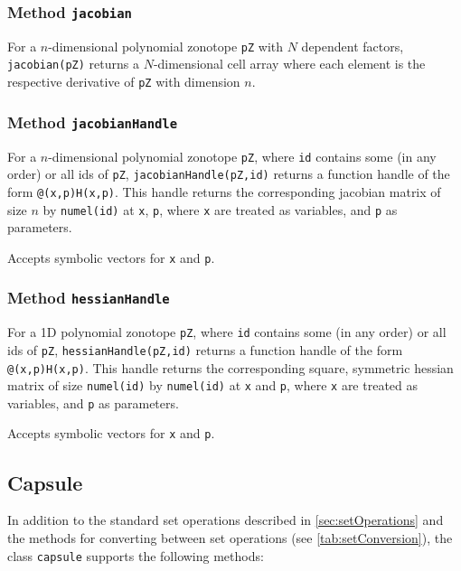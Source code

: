 \subsubsection{Method \texttt{jacobian}}
For a $n$-dimensional polynomial zonotope \texttt{pZ} with $N$ dependent factors, \texttt{jacobian(pZ)} returns a $N$-dimensional cell array where each element is the respective derivative of \texttt{pZ} with dimension $n$.

\subsubsection{Method \texttt{jacobianHandle}}
For a $n$-dimensional polynomial zonotope \texttt{pZ}, where \texttt{id} contains some (in any order) or all ids of \texttt{pZ}, \texttt{jacobianHandle(pZ,id)} returns a function handle of the form \texttt{@(x,p)H(x,p)}. This handle returns the corresponding jacobian matrix of size $n$ by \texttt{numel(id)} at \texttt{x}, \texttt{p}, where \texttt{x} are treated as variables, and \texttt{p} as parameters.

Accepts symbolic vectors for \texttt{x} and \texttt{p}.

\subsubsection{Method \texttt{hessianHandle}}

For a 1D polynomial zonotope \texttt{pZ}, where \texttt{id} contains some (in any order) or all ids of \texttt{pZ}, \texttt{hessianHandle(pZ,id)} returns a function handle of the form \texttt{@(x,p)H(x,p)}. This handle returns the corresponding square, symmetric hessian matrix of size \texttt{numel(id)} by \texttt{numel(id)} at \texttt{x} and \texttt{p}, where \texttt{x} are treated as variables, and \texttt{p} as parameters.

Accepts symbolic vectors for \texttt{x} and \texttt{p}.


\subsection{Capsule}    \label{sec:capsuleOperations}

In addition to the standard set operations described in \cref{sec:setOperations} and the methods for converting between set operations (see \cref{tab:setConversion}), the class \texttt{capsule} supports the following methods:

